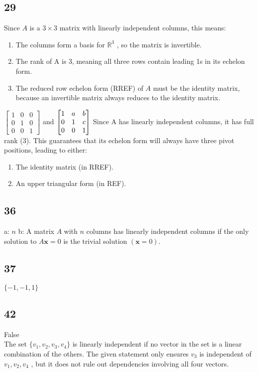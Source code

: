 \documentclass{article}
\begin{document}
\subsection*{29}
Since  $A$  is a  $3 \times 3 $ matrix with linearly independent columns, this means:
\begin{enumerate}
    \item 	The columns form a basis for  $\mathbb{R}^3$ , so the matrix is invertible.
    \item The rank of  A  is 3, meaning all three rows contain leading 1s in its echelon form.
    \item The reduced row echelon form (RREF) of  $A$  must be the identity matrix, because an invertible matrix always reduces to the identity matrix.
\end{enumerate}
$
\begin{bmatrix} 1 & 0 & 0 \\ 0 & 1 & 0 \\ 0 & 0 & 1 \end{bmatrix}
$ and $\begin{bmatrix} 1 & a & b \\ 0 & 1 & c \\ 0 & 0 & 1 \end{bmatrix}
\\[0.1in]$ Since  A  has linearly independent columns, it has full rank (3). This guarantees that its echelon form will always have three pivot positions, leading to either:
\begin{enumerate}
    \item The identity matrix (in RREF).
    \item An upper triangular form (in REF).
\end{enumerate}
\subsection*{36}
a: $n$
b: A matrix $ A $ with $ n $ columns has linearly independent columns if the only solution to  $A\mathbf{x} = 0$  is the trivial solution $(\mathbf{x} = 0)$.
\subsection*{37}
$\{-1, -1, 1\}$
\subsection*{42}
False
\\ The set  $\{ v_1, v_2, v_3, v_4 \}$  is linearly independent if no vector in the set is a linear combination of the others. The given statement only ensures  $v_3 $ is independent of  $v_1, v_2, v_4$ , but it does not rule out dependencies involving all four vectors.
\end{document}
